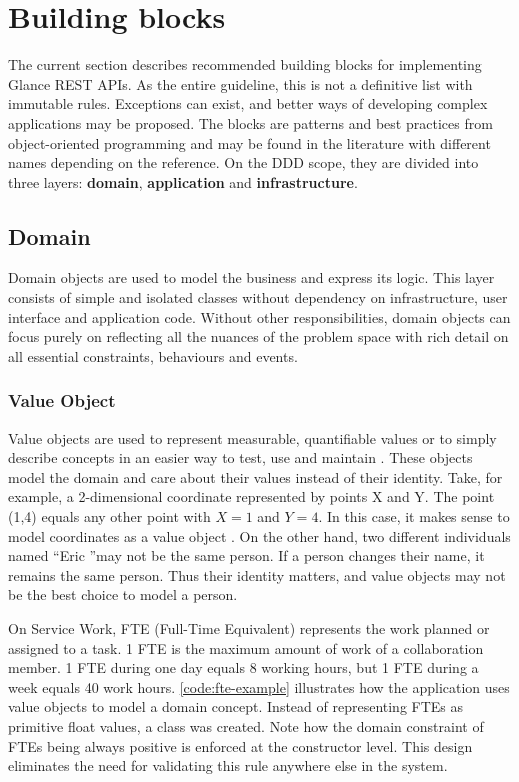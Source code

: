 \section{Building blocks}
\label{sec:building-blocks}

The current section describes recommended building blocks for implementing Glance REST APIs. As the entire guideline, this is not a definitive list with immutable rules. Exceptions can exist, and better ways of developing complex applications may be proposed. The blocks are patterns and best practices from object-oriented programming and may be found in the literature with different names depending on the reference. On the DDD scope, they are divided into three layers: \textbf{domain}, \textbf{application} and \textbf{infrastructure}. 

\subsection{Domain}

Domain objects are used to model the business and express its logic. This layer consists of simple and isolated classes without dependency on infrastructure, user interface and application code. Without other responsibilities, domain objects can focus purely on reflecting all the nuances of the problem space with rich detail on all essential constraints, behaviours and events.

\subsubsection{Value Object}
\label{sec:value-object}

Value objects \cite{ddd-blue-book} \cite{ddd-reference} are used to represent measurable, quantifiable values or to simply describe concepts in an easier way to test, use and maintain \cite{ddd-red-book}. These objects model the domain and care about their values instead of their identity. Take, for example, a 2-dimensional coordinate represented by points X and Y. The point (1,4) equals any other point with $X = 1$ and $Y = 4$. In this case, it makes sense to model coordinates as a value object \cite{fowler-value-objects}. On the other hand, two different individuals named ``Eric ''may not be the same person. If a person changes their name, it remains the same person. Thus their identity matters, and value objects may not be the best choice to model a person.

On Service Work, FTE (Full-Time Equivalent) represents the work planned or assigned to a task. 1 FTE is the maximum amount of work of a collaboration member. 1 FTE during one day equals 8 working hours, but 1 FTE during a week equals 40 work hours. \autoref{code:fte-example} illustrates how the application uses value objects to model a domain concept. Instead of representing FTEs as primitive float values, a class was created. Note how the domain constraint of FTEs being always positive is enforced at the constructor level. This design eliminates the need for validating this rule anywhere else in the system.

